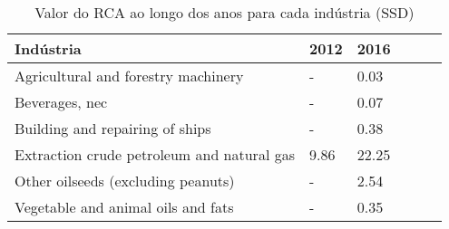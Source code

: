 \begin{table}
\centering
\caption{Valor do RCA ao longo dos anos para cada indústria (SSD)}
\label{tab:ex3-tempo-SSD}
\begin{tabular}{p{6cm}p{1.5cm}p{1.5cm}p{1.5cm}p{1.5cm}p{1.5cm}}
\toprule
                                 Indústria & 2012 &  2016 \\
\midrule
       Agricultural and forestry machinery &    - &  0.03 \\
                            Beverages, nec &    - &  0.07 \\
           Building and repairing of ships &    - &  0.38 \\
Extraction crude petroleum and natural gas & 9.86 & 22.25 \\
        Other oilseeds (excluding peanuts) &    - &  2.54 \\
        Vegetable and animal oils and fats &    - &  0.35 \\
\bottomrule
\end{tabular}
\end{table}
